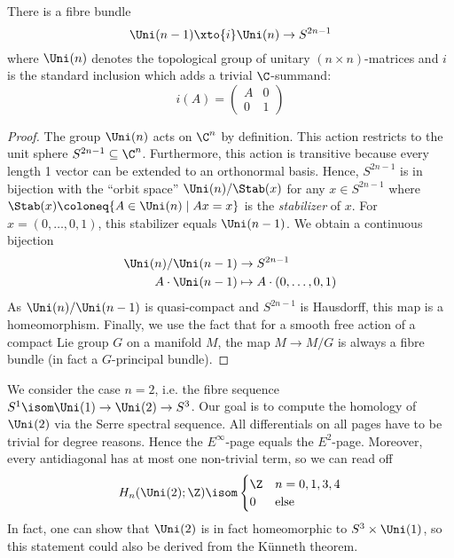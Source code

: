 \documentclass[wip, topology]{bsteffan-lecturenotes}
\begin{document}
\begin{lemma}
	There is a fibre bundle
	\begin{equation*}
		\Uni(n - 1) \xto{i} \Uni(n) \to S^{2n - 1}
	\end{equation*}
	where $\Uni(n)$ denotes the topological group of unitary $(n \times n)$-matrices and $i$ is the standard inclusion which adds a trivial $\C$-summand:
	\begin{equation*}
		i(A) = \begin{pmatrix}
			A & 0 \\
			0 & 1
		\end{pmatrix}
	\end{equation*}
\end{lemma}
\begin{proof}
	The group $\Uni(n)$ acts on $\C^n$ by definition.
	This action restricts to the unit sphere $S^{2n - 1} \subseteq \C^n$.
	Furthermore, this action is transitive because every length 1 vector can be extended to an orthonormal basis.
	Hence, $S^{2n - 1}$ is in bijection with the \enquote{orbit space} $\Uni(n) / \Stab(x)$ for any $x \in S^{2n - 1}$ where $\Stab(x) \coloneq \{A \in \Uni(n) \mid Ax = x\}$ is the \emph{stabilizer} of $x$.
	For $x = (0, \ldots, 0, 1)$, this stabilizer equals $\Uni(n - 1)$.
	We obtain a continuous bijection
	\begin{align*}
		\Uni(n) / \Uni(n - 1) &\to S^{2n - 1} \\
		A \cdot \Uni(n - 1) &\mapsto A \cdot (0, \ldots, 0, 1)
	\end{align*}
	As $\Uni(n) / \Uni(n - 1)$ is quasi-compact and $S^{2n - 1}$ is Hausdorff, this map is a homeomorphism.
	Finally, we use the fact that for a smooth free action of a compact Lie group $G$ on a manifold $M$, the map $M \to M / G$ is always a fibre bundle (in fact a $G$-principal bundle).
\end{proof}
\begin{example}
	We consider the case $n = 2$, i.e. the fibre sequence $S^1 \isom \Uni(1) \to \Uni(2) \to S^3$.
	Our goal is to compute the homology of $\Uni(2)$ via the Serre spectral sequence.
	All differentials on all pages have to be trivial for degree reasons.
	Hence the $E^\infty$-page equals the $E^2$-page.
	Moreover, every antidiagonal has at most one non-trivial term, so we can read off
	\begin{equation*}
		H_n(\Uni(2); \Z) \isom \begin{cases}
			\Z & n = 0, 1, 3, 4 \\
			0  & \text{else}
		\end{cases}
	\end{equation*}
	In fact, one can show that $\Uni(2)$ is in fact homeomorphic to $S^3 \times \Uni(1)$, so this statement could also be derived from the Künneth theorem.
\end{example}
\end{document}
